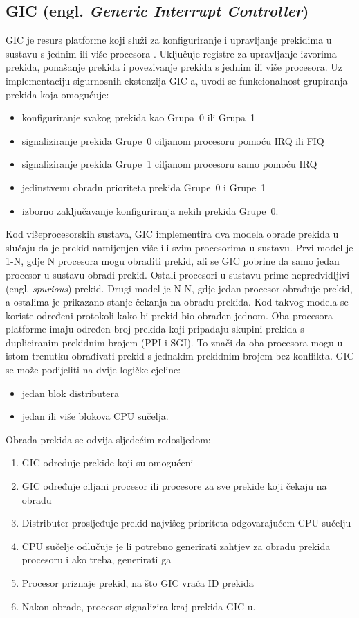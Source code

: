 \documentclass[times, utf8, diplomski, numeric]{fer}
\begin{document}
\subsection{GIC (engl. \textit{Generic Interrupt Controller})}
GIC je resurs platforme koji služi za konfiguriranje i upravljanje prekidima u sustavu s jednim ili više procesora
\cite{gic}.
Uključuje registre za upravljanje izvorima prekida, ponašanje prekida i povezivanje prekida s jednim ili više
procesora. Uz implementaciju sigurnosnih ekstenzija GIC-a, uvodi se funkcionalnost grupiranja prekida koja omogućuje:
\begin{itemize}
  \item{konfiguriranje svakog prekida kao Grupa~0 ili Grupa~1}
  \item{signaliziranje prekida Grupe~0 ciljanom procesoru pomoću IRQ ili FIQ}
  \item{signaliziranje prekida Grupe~1 ciljanom procesoru samo pomoću IRQ}
  \item{jedinstvenu obradu prioriteta prekida Grupe~0 i Grupe~1}
  \item{izborno zaključavanje konfiguriranja nekih prekida Grupe~0.}
\end{itemize}
Kod višeprocesorskih sustava, GIC implementira dva modela obrade prekida u slučaju da je prekid namijenjen više
ili svim procesorima u sustavu. Prvi model je 1-N, gdje N procesora mogu obraditi prekid, ali se GIC pobrine da samo
jedan procesor u sustavu obradi prekid. Ostali procesori u sustavu prime nepredvidljivi (engl. \textit{spurious}) prekid.
Drugi model je N-N, gdje jedan procesor obrađuje prekid, a ostalima je prikazano stanje čekanja na obradu prekida.
Kod takvog modela se koriste određeni protokoli kako bi prekid bio obrađen jednom. Oba procesora platforme imaju određen
broj prekida koji pripadaju skupini prekida s dupliciranim prekidnim brojem (PPI i SGI). To znači da oba procesora mogu u
istom trenutku obrađivati prekid s jednakim prekidnim brojem bez konflikta. GIC se može podijeliti na dvije logičke cjeline:
\begin{itemize}
  \item{jedan blok distributera}
  \item{jedan ili više blokova CPU sučelja.}
\end{itemize}
Obrada prekida se odvija sljedećim redosljedom:
\begin{enumerate}
  \item{GIC određuje prekide koji su omogućeni}
  \item{GIC određuje ciljani procesor ili procesore za sve prekide koji čekaju na obradu}
  \item{Distributer prosljeđuje prekid najvišeg prioriteta odgovarajućem CPU sučelju}
  \item{CPU sučelje odlučuje je li potrebno generirati zahtjev za obradu prekida procesoru i ako treba, generirati ga}
  \item{Procesor priznaje prekid, na što GIC vraća ID prekida}
  \item{Nakon obrade, procesor signalizira kraj prekida GIC-u.}
\end{enumerate}
\end{document}
